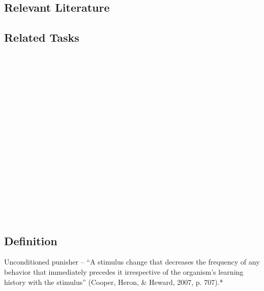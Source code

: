\subsection{Relevant Literature}
\begin{refsection}
\nocite{test,alang2017police,clayton2018black}
\printbibliography[heading=none]
\end{refsection}
%
\subsection{Related Tasks}
\fourcOne{}\\
\fourdOne{}\\
\fourdTwo{}\\
\fourdTwenty{}\\
\fourdTwentyOne{}\\
\fourfTwo{}\\
\fourjFour{}\\
\fourkFour{}\\
\fourFKTwo{}\\
\fourFKFourteen{}\\
\fourFKFifteen{}\\
\fourFKSixteen{}\\
\fourFKSeventeen{}\\
\fourFKTwentyOne{}\\
\fourFKTwentySix{}\\
\fourFKTwentySeven{}\\
%
%
%
%
%
%
%
\section{\fourFKNineteen{}}
\subsection{Definition}
Unconditioned punisher – ``A stimulus change that decreases the frequency of any behavior that immediately precedes it irrespective of the organism's learning history with the stimulus'' (Cooper, Heron, \& Heward, 2007, p. 707).*
%
